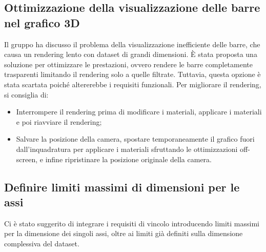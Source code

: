 \subsection{Ottimizzazione della visualizzazione delle barre nel grafico 3D}
Il gruppo ha discusso il problema della visualizzazione inefficiente delle barre, che causa un rendering lento con dataset di grandi dimensioni. È stata proposta una soluzione per ottimizzare le prestazioni, ovvero rendere le barre completamente trasparenti limitando il rendering solo a quelle filtrate. Tuttavia, questa opzione è stata scartata poiché altererebbe i requisiti funzionali.
Per migliorare il rendering, si consiglia di:
\begin{itemize}
\item Interrompere il rendering prima di modificare i materiali, applicare i materiali e poi riavviare il rendering;
\item Salvare la posizione della camera, spostare temporaneamente il grafico fuori dall'inquadratura per applicare i materiali sfruttando le ottimizzazioni off-screen, e infine ripristinare la posizione originale della camera.
\end{itemize}
\subsection{Definire limiti massimi di dimensioni per le assi}
Ci è stato suggerito di integrare i requisiti di vincolo introducendo limiti massimi per la dimensione dei singoli assi, oltre ai limiti già definiti sulla dimensione complessiva del dataset.

